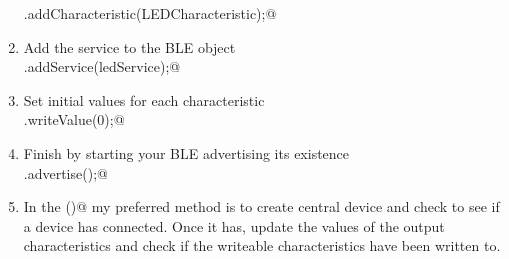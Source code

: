 \begin{enumerate}
        \lstinline@ledService.addCharacteristic(LEDCharacteristic);@
    \item Add the service to the BLE object \\
        \lstinline@BLE.addService(ledService);@
    \item Set initial values for each characteristic \\
        \lstinline@LEDCharacteristic.writeValue(0);@
    \item Finish by starting your BLE advertising its existence \\
        \lstinline@BLE.advertise();@
    \item In the \lstinline@loop()@ my preferred method is to create central device
            and check to see if a device has connected. Once it has, update the 
            values of the output characteristics and check if the writeable 
            characteristics have been written to.
\end{enumerate}
